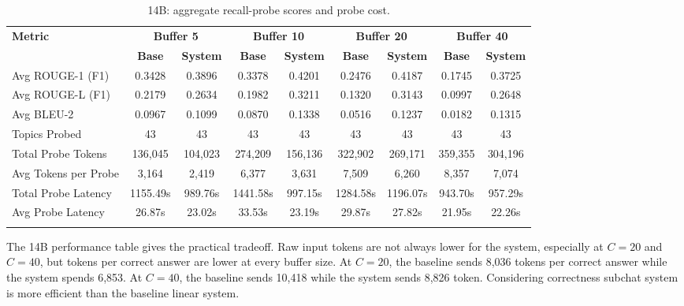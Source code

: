 \documentclass[pdflatex,sn-mathphys-num]{sn-jnl}%
\theoremstyle{thmstyleone}%
\theoremstyle{thmstyletwo}%
\theoremstyle{thmstylethree}%
\begin{document}
\begin{table}[htbp]
\caption{14B: aggregate recall-probe scores and probe cost.}\label{tab:14b_recall_main}
\centering
\scriptsize
\setlength{\tabcolsep}{3pt}
\begin{adjustbox}{width=\textwidth}
\begin{tabular}{lcccccccc}
\toprule
\textbf{Metric} & \multicolumn{2}{c}{\textbf{Buffer 5}} & \multicolumn{2}{c}{\textbf{Buffer 10}} & \multicolumn{2}{c}{\textbf{Buffer 20}} & \multicolumn{2}{c}{\textbf{Buffer 40}} \\
\cmidrule(lr){2-3}\cmidrule(lr){4-5}\cmidrule(lr){6-7}\cmidrule(lr){8-9}
 & \textbf{Base} & \textbf{System} & \textbf{Base} & \textbf{System} & \textbf{Base} & \textbf{System} & \textbf{Base} & \textbf{System} \\
\midrule
Avg ROUGE-1 (F1) & 0.3428 & 0.3896 & 0.3378 & 0.4201 & 0.2476 & 0.4187 & 0.1745 & 0.3725 \\
Avg ROUGE-L (F1) & 0.2179 & 0.2634 & 0.1982 & 0.3211 & 0.1320 & 0.3143 & 0.0997 & 0.2648 \\
Avg BLEU-2 & 0.0967 & 0.1099 & 0.0870 & 0.1338 & 0.0516 & 0.1237 & 0.0182 & 0.1315 \\
Topics Probed & 43 & 43 & 43 & 43 & 43 & 43 & 43 & 43 \\
Total Probe Tokens & 136,045 & 104,023 & 274,209 & 156,136 & 322,902 & 269,171 & 359,355 & 304,196 \\
Avg Tokens per Probe & 3,164 & 2,419 & 6,377 & 3,631 & 7,509 & 6,260 & 8,357 & 7,074 \\
Total Probe Latency & 1155.49s & 989.76s & 1441.58s & 997.15s & 1284.58s & 1196.07s & 943.70s & 957.29s \\
Avg Probe Latency & 26.87s & 23.02s & 33.53s & 23.19s & 29.87s & 27.82s & 21.95s & 22.26s \\
\botrule
\end{tabular}
\end{adjustbox}
\end{table}

The 14B performance table gives the practical tradeoff. Raw input tokens are not always lower for the system, especially at $C=20$ and $C=40$, but tokens per correct answer are lower at every buffer size. At $C=20$, the baseline sends 8,036 tokens per correct answer while the system spends 6,853. At $C=40$, the baseline sends 10,418 while the system sends 8,826 token. Considering correctness subchat system is more efficient than the baseline linear system.
\end{document}
